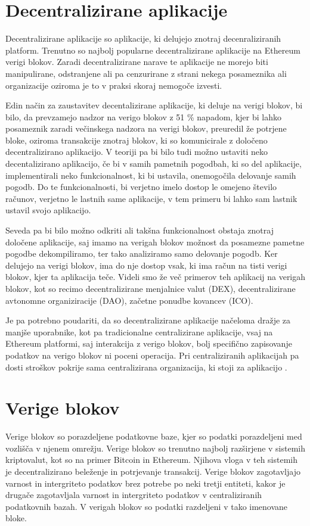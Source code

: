 \documentclass[a4paper,12pt,openright]{book}
\begin{document}
\section{Decentralizirane aplikacije}
Decentralizirane aplikacije so aplikacije, ki delujejo znotraj decenraliziranih platform.
Trenutno so najbolj popularne decentralizirane aplikacije na Ethereum verigi blokov.
Zaradi decentralizirane narave te aplikacije ne morejo biti manipulirane, odstranjene ali pa cenzurirane z strani 
nekega posameznika ali organizacije oziroma je to v praksi skoraj nemogoče izvesti.

Edin način za zaustavitev decentalizirane aplikacije, ki deluje na verigi blokov, bi bilo, da prevzamejo nadzor na verigo blokov z 51 \% napadom, 
kjer bi lahko posameznik zaradi večinskega nadzora na verigi blokov, preuredil že potrjene bloke, oziroma transakcije znotraj blokov, ki so 
komunicirale z določeno decentralizirano aplikacijo. 
V teoriji pa bi bilo tudi možno ustaviti neko decentalizirano aplikacijo, če bi v samih pametnih pogodbah, ki so del aplikacije, implementirali
neko funkcionalnost, ki bi ustavila, onemogočila delovanje samih pogodb.
Do te funkcionalnosti, bi verjetno imelo dostop le omejeno število računov, verjetno le lastnih same aplikacije, 
v tem primeru bi lahko sam lastnik ustavil svojo aplikacijo.

Seveda pa bi bilo možno odkriti ali takšna funkcionalnost obstaja znotraj določene aplikacije, 
saj imamo na verigah blokov možnost da posamezne pametne pogodbe dekompiliramo, ter tako analiziramo samo delovanje pogodb.
Ker delujejo na verigi blokov, ima do nje dostop vsak, ki ima račun na tisti verigi blokov, kjer ta aplikacija teče.
Videli smo že več primerov teh aplikacij na verigah blokov, kot so recimo decentralizirane menjalnice valut (DEX),
decentralizirane avtonomne organiziracije (DAO), začetne ponudbe kovancev (ICO).

Je pa potrebno poudariti, da so decentralizirane aplikacije načeloma dražje za manjše uporabnike, kot pa tradicionalne centralizirane aplikacije, 
vsaj na Ethereum platformi, saj interakcija z verigo blokov, bolj specifično zapisovanje podatkov na verigo blokov ni poceni operacija.
Pri centraliziranih aplikacijah pa dosti stroškov pokrije sama centralizirana organizacija, ki stoji za aplikacijo \cite{dapps_investopedia} \cite{51_attack_investopedia}.


\section{Verige blokov}
Verige blokov so porazdeljene podatkovne baze, kjer so podatki porazdeljeni med vozlišča v njenem omrežju.
Verige blokov so trenutno najbolj razširjene v sistemih kriptovalut, kot so na primer Bitcoin in Ethereum.
Njihova vloga v teh sistemih je decentralizirano beleženje in potrjevanje transakcij.
Verige blokov zagotavljajo varnost in intergriteto podatkov brez potrebe po neki tretji entiteti, kakor je drugače zagotavljala varnost in intergriteto podatkov v centraliziranih podatkovnih bazah.
V verigah blokov so podatki razdeljeni v tako imenovane bloke.
\end{document}
